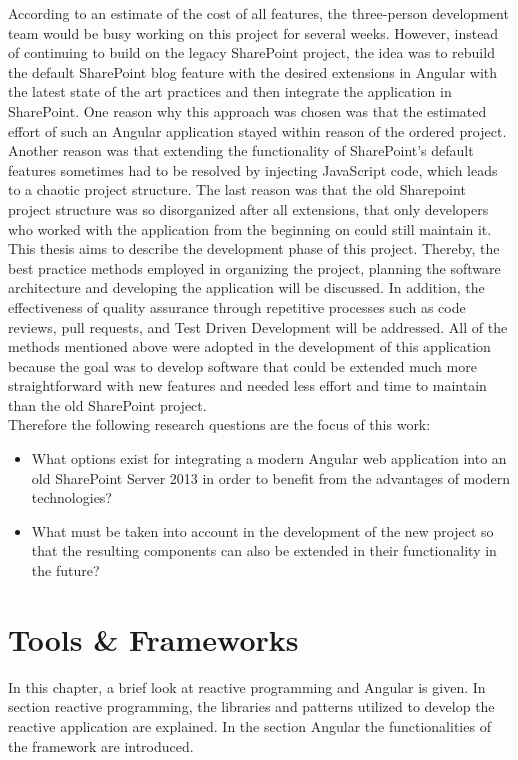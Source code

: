 \documentclass[Bachelor,BIF,english]{twbook}
\begin{document}
According to an estimate of the cost of all features, the three-person development team would be busy working on this project for several weeks. However, instead of continuing to build on the legacy SharePoint project, the idea was to rebuild the default SharePoint blog feature with the desired extensions in Angular with the latest state of the art practices and then integrate the application in SharePoint. One reason why this approach was chosen was that the estimated effort of such an Angular application stayed within reason of the ordered project. Another reason was that extending the functionality of SharePoint's default features sometimes had to be resolved by injecting JavaScript code, which leads to a chaotic project structure. The last reason was that the old Sharepoint project structure was so disorganized after all extensions, that only developers who worked with the application from the beginning on could still maintain it.
\\[\baselineskip]
This thesis aims to describe the development phase of this project. Thereby, the best practice methods employed in organizing the project, planning the software architecture and developing the application will be discussed. In addition, the effectiveness of quality assurance through repetitive processes such as code reviews, pull requests, and Test Driven Development will be addressed. All of the methods mentioned above were adopted in the development of this application because the goal was to develop software that could be extended much more straightforward with new features and needed less effort and time to maintain than the old SharePoint project.
\\[\baselineskip]
Therefore the following research questions are the focus of this work:
\begin{itemize}
\item What options exist for integrating a modern Angular web application into an old SharePoint Server 2013 in order to benefit from the advantages of modern technologies?
\item What must be taken into account in the development of the new project so that the resulting components can also be extended in their functionality in the future?
\end{itemize}

\clearpage


\chapter{Tools \& Frameworks} 
In this chapter, a brief look at reactive programming and Angular is given. In section reactive programming, the libraries and patterns utilized to develop the reactive application are explained. In the section Angular the functionalities of the framework are introduced.
\end{document}
